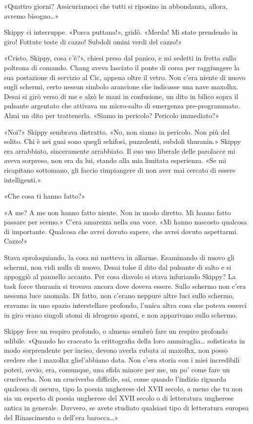 «Quattro giorni? Assicuriamoci che tutti si riposino in abbondanza,
allora, avremo bisogno\ldots»

Skippy ci interruppe. «Porca puttana!», gridò. «Merda! Mi state
prendendo in giro! Fottute teste di cazzo! Subdoli omini verdi del
cazzo!»

«Cristo, Skippy, cosa c'è?», chiesi preso dal panico, e mi sedetti in
fretta sulla poltrona di comando. Chang aveva lasciato il ponte di corsa
per raggiungere la sua postazione di servizio al Cic, appena oltre il
vetro. Non c'era niente di nuovo sugli schermi, certo nessun simbolo
arancione che indicasse una nave maxolhx. Desai si girò verso di me e
alzò le mani in confusione, un dito in bilico sopra il pulsante
argentato che attivava un micro-salto di emergenza pre-programmato.
Alzai un dito per trattenerla. «Siamo in pericolo? Pericolo immediato?»

«Noi?» Skippy sembrava distratto. «No, non siamo in pericolo. Non più
del solito. Chi è nei guai sono quegli schifosi, puzzolenti, subdoli
thuranin.» Skippy era arrabbiato, sinceramente arrabbiato. Il suo uso
liberale delle parolacce mi aveva sorpreso, non era da lui, stando alla
mia limitata esperienza. «Se mi ricapitano sottomano, gli faccio
rimpiangere di non aver mai cercato di essere intelligenti.»

«Che cosa ti hanno fatto?»

«A me? A me non hanno fatto niente. Non in modo diretto. Mi hanno fatto
passare per scemo.» C'era amarezza nella sua voce. «Mi hanno nascosto
qualcosa di importante. Qualcosa che avrei dovuto sapere, che avrei
dovuto aspettarmi. Cazzo!»

Stava sproloquiando, la cosa mi metteva in allarme. Esaminando di nuovo
gli schermi, non vidi nulla di nuovo. Desai tolse il dito dal pulsante
di salto e si appoggiò al pannello accanto. Per cosa diavolo si stava
infuriando Skippy? La task force thuranin si trovava ancora dove doveva
essere. Sullo schermo non c'era nessuna luce anomala. Di fatto, non
c'erano neppure altre luci sullo schermo, eravamo in uno spazio
interstellare profondo, l'unica altra cosa che poteva esserci in giro
erano singoli atomi di idrogeno sparsi, e non apparivano sullo schermo.

Skippy fece un respiro profondo, o almeno sembrò fare un respiro
profondo udibile. «Quando ho craccato la crittografia della loro
ammiraglia\ldots{} sofisticata in modo sorprendente per inciso, devono
averla rubata ai maxolhx, non posso credere che i maxolhx gliel'abbiano
data. Non c'era storia con i miei incredibili poteri, ovvio, era,
comunque, una sfida minore per me, un po' come fare un cruciverba. Non
un cruciverba difficile, sai, come quando l'indizio riguarda qualcosa di
oscuro, tipo la poesia ungherese del XVII secolo, a meno che tu non sia
un esperto di poesia ungherese del XVII secolo o di letteratura
ungherese antica in generale. Davvero, se avete studiato qualsiasi tipo
di letteratura europea del Rinascimento o dell'era barocca\ldots»


